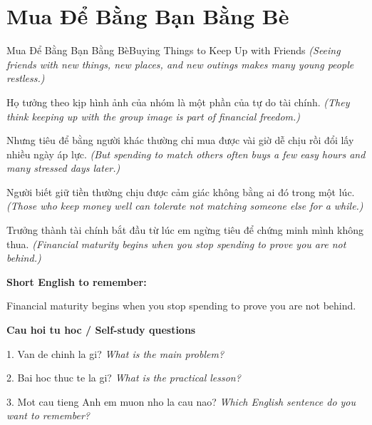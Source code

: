 \section{Mua Để Bằng Bạn Bằng Bè}
\begin{truyen}{Mua Để Bằng Bạn Bằng Bè}{Buying Things to Keep Up with Friends}
\textit{(Seeing friends with new things, new places, and new outings makes many young people restless.)}

Họ tưởng theo kịp hình ảnh của nhóm là một phần của tự do tài chính.
\textit{(They think keeping up with the group image is part of financial freedom.)}

Nhưng tiêu để bằng người khác thường chỉ mua được vài giờ dễ chịu rồi đổi lấy nhiều ngày áp lực.
\textit{(But spending to match others often buys a few easy hours and many stressed days later.)}

Người biết giữ tiền thường chịu được cảm giác không bằng ai đó trong một lúc.
\textit{(Those who keep money well can tolerate not matching someone else for a while.)}

\end{truyen}

\begin{baihoc}
Trưởng thành tài chính bắt đầu từ lúc em ngừng tiêu để chứng minh mình không thua.
\textit{(Financial maturity begins when you stop spending to prove you are not behind.)}
\end{baihoc}

\begin{ghinhoanh}
\textbf{Short English to remember:}

Financial maturity begins when you stop spending to prove you are not behind.

\end{ghinhoanh}

\begin{tuhocnhanh}
\textbf{Cau hoi tu hoc / Self-study questions}

1. Van de chinh la gi? \textit{What is the main problem?}

2. Bai hoc thuc te la gi? \textit{What is the practical lesson?}

3. Mot cau tieng Anh em muon nho la cau nao? \textit{Which English sentence do you want to remember?}
\end{tuhocnhanh}
\ngancach

